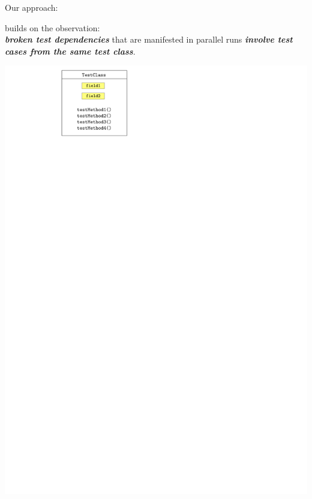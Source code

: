 \documentclass{beamer}
\begin{document}
\begin{frame}{Our approach: \textbf{\tname}}
	
\textbf{\tname} builds on the observation:\\
{\rsm \textit{\textbf{broken test dependencies}}} that are manifested in parallel runs {\rsm \textit{\textbf{involve test cases from the same test class}}}.
	\begin{center}
		\begin{minipage}{0.48\linewidth}
			\centering
			\includegraphics[width=\linewidth,page=5]{images/flakes.pdf}
		\end{minipage}%
		\hfill
		\begin{minipage}{0.48\linewidth}
			\centering

\end{minipage}
\end{center}
\end{frame}
\end{document}
